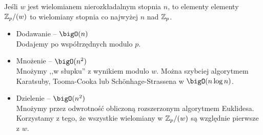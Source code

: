 Jeśli \( w \) jest wielomianem nierozkładalnym stopnia \( n \), to elementy
elementy \( \mathbb{Z}_p/(w) \) to wielomiany stopnia co najwyżej \( n \) nad \( \mathbb{Z}_p \).
\begin{itemize}
	\item Dodawanie -- \( \bigO(n) \) \\
	      Dodajemy po współrzędnych modulo \( p \).
	\item Mnożenie -- \( \bigO(n^2) \) \\
	      Mnożymy ,,w słupku'' z wynikiem modulo \( w \). Można szybciej algorytmem Karatsuby, Tooma-Cooka lub Sch\"onhage-Strassena w \( \bigO(n\log n) \).
	\item Dzielenie -- \( \bigO(n^2) \) \\
	      Mnożymy przez odwrotność obliczoną rozszerzonym algorytmem Euklidesa. Korzystamy z tego, że wszystkie wielomiany w \( \mathbb{Z}_p/(w) \) są względnie pierwsze z \( w \).
\end{itemize}
